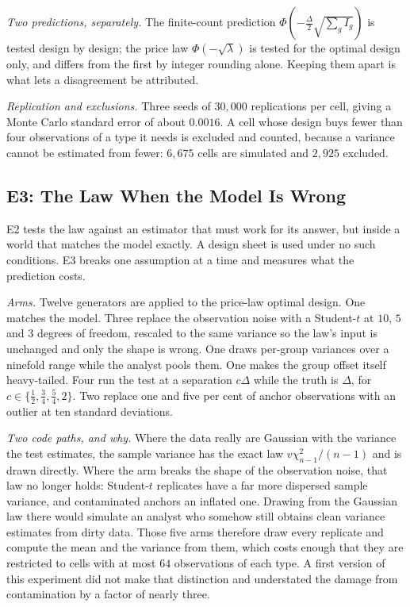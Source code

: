 \documentclass[conference]{IEEEtran}
\theoremstyle{definition}
\begin{document}
\emph{Two predictions, separately.} The finite-count prediction
$\Phi(-\tfrac{\Delta}{2}\sqrt{\textstyle\sum_{g}I_{g}})$ is tested design by design; the
price law $\Phi(-\sqrt{\lambda})$ is tested for the optimal design only, and differs from
the first by integer rounding alone. Keeping them apart is what lets a disagreement be
attributed.

\emph{Replication and exclusions.} Three seeds of $30{,}000$ replications per cell, giving a
Monte Carlo standard error of about $0.0016$. A cell whose design buys fewer than four
observations of a type it needs is excluded and counted, because a variance cannot be
estimated from fewer: $6{,}675$ cells are simulated and $2{,}925$ excluded.

\subsection{E3: The Law When the Model Is Wrong}
\label{sec:e3}

E2 tests the law against an estimator that must work for its answer, but inside a world that
matches the model exactly. A design sheet is used under no such conditions. E3 breaks one
assumption at a time and measures what the prediction costs.

\emph{Arms.} Twelve generators are applied to the price-law optimal design. One matches the
model. Three replace the observation noise with a Student-$t$ at $10$, $5$ and $3$ degrees of
freedom, rescaled to the same variance so the law's input is unchanged and only the shape is
wrong. One draws per-group variances over a ninefold range while the analyst pools them. One
makes the group offset itself heavy-tailed. Four run the test at a separation
$c\Delta$ while the truth is $\Delta$, for $c\in\{\tfrac12,\tfrac34,\tfrac54,2\}$. Two
replace one and five per cent of anchor observations with an outlier at ten standard
deviations.

\emph{Two code paths, and why.} Where the data really are Gaussian with the variance the test
estimates, the sample variance has the exact law $v\chi^{2}_{n-1}/(n-1)$ and is drawn
directly. Where the arm breaks the shape of the observation noise, that law no longer holds:
Student-$t$ replicates have a far more dispersed sample variance, and contaminated anchors an
inflated one. Drawing from the Gaussian law there would simulate an analyst who somehow still
obtains clean variance estimates from dirty data. Those five arms therefore draw every
replicate and compute the mean and the variance from them, which costs enough that they are
restricted to cells with at most $64$ observations of each type. A first version of this
experiment did not make that distinction and understated the damage from contamination by a
factor of nearly three.
\end{document}
